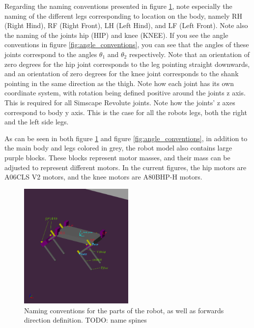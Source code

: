 Regarding the naming conventions presented in figure \ref{fig:name_conventions}, note especially the naming of the different legs corresponding to location on the body, namely RH (Right Hind), RF (Right Front), LH (Left Hind), and LF (Left Front). Note also the naming of the joints hip (HIP) and knee (KNEE). If you see the angle conventions in figure \ref{fig:angle_conventions}, you can see that the angles of these joints correspond to the angles $\theta_1$ and $\theta_2$ respectively. Note that an orientation of zero degrees for the hip joint corresponds to the leg pointing straight downwards, and an orientation of zero degrees for the knee joint corresponds to the shank pointing in the same direction as the thigh. Note how each joint has its own coordinate system, with rotation being defined positive around the joints z axis. This is required for all Simscape Revolute joints. Note how the joints' z axes correspond to body y axis. This is the case for all the robots legs, both the right and the left side legs. 


As can be seen in both figure \ref{fig:name_conventions} and figure \ref{fig:angle_conventions}, in addition to the main body and legs colored in grey, the robot model also contains large purple blocks. These blocks represent motor masses, and their mass can be adjusted to represent different motors. In the current figures, the hip motors are A06CLS V2 motors, and the knee motors are A80BHP-H motors. 

\begin{figure}
    \centering
    \includegraphics[width=0.5\textwidth]{Images/name_conventions.png}
    \caption{Naming conventions for the parts of the robot, as well as forwards direction definition. TODO: name spines}
    \label{fig:name_conventions}
\end{figure}

